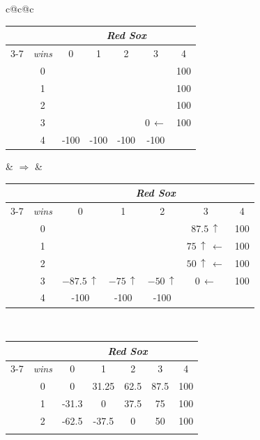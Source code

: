 
\begin{figure}[ht]
\centering
\scriptsize
\setlength{\tabcolsep}{2.2pt}
\renewcommand{\arraystretch}{1.25}
\begin{tabular}{c@{\qquad}c@{\qquad}c}
\begin{tabular}{|c|c|ccccc|}
\hline
& & \multicolumn{5}{c|}{\emph{Red Sox}}\\
\cline{3-7}
& \emph{wins} & 0 & 1 & 2 & 3 & 4\\
\hline
\multirow{5}{*}{\rotatebox[origin=c]{90}{Colorado Rockies}}
& 0 &  &  &  &  & 100\\ \cline{2-7}
& 1 &  &  &  &  & 100\\ \cline{2-7}
& 2 &  &  &  &  & 100\\ \cline{2-7}
& 3 &  &  &  & \(0\,\leftarrow\) & 100\\ \cline{2-7}
& 4 & -100 & -100 & -100 & -100 & \\
\hline
\end{tabular}
& \(\Longrightarrow\) &
\begin{tabular}{|c|c|ccccc|}
\hline
& & \multicolumn{5}{c|}{\emph{Red Sox}}\\
\cline{3-7}
& \emph{wins} & 0 & 1 & 2 & 3 & 4\\
\hline
\multirow{5}{*}{\rotatebox[origin=c]{90}{Colorado Rockies}}
& 0 &  &  &  & \(87.5\,\uparrow\) & 100\\ \cline{2-7}
& 1 &  &  &  & \(75\,\uparrow\,\leftarrow\) & 100\\ \cline{2-7}
& 2 &  &  &  & \(50\,\uparrow\,\leftarrow\) & 100\\ \cline{2-7}
& 3 & \(-87.5\,\uparrow\) & \(-75\,\uparrow\) & \(-50\,\uparrow\) & \(0\,\leftarrow\) & 100\\ \cline{2-7}
& 4 & -100 & -100 & -100 &  & \\
\hline
\end{tabular}\\[1.2em]
\begin{tabular}{|c|c|ccccc|}
\hline
& & \multicolumn{5}{c|}{\emph{Red Sox}}\\
\cline{3-7}
& \emph{wins} & 0 & 1 & 2 & 3 & 4\\
\hline
\multirow{5}{*}{\rotatebox[origin=c]{90}{Colorado Rockies}}
& 0 & 0 & 31.25 & 62.5 & 87.5 & 100\\ \cline{2-7}
& 1 & -31.3 & 0 & 37.5 & 75 & 100\\ \cline{2-7}
& 2 & -62.5 & -37.5 & 0 & 50 & 100\\ \cline{2-7}

\end{tabular}
\end{tabular}
\end{figure}
